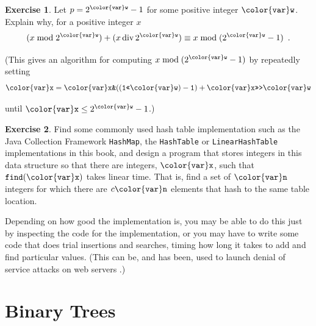 \documentclass[10pt]{book}
\newcommand{\cpponly}[1]{}\newcommand{\javaonly}[1]{#1}\newcommand{\pcodeonly}[1]{}\newcommand{\notpcode}[1]{#1}\newcommand{\lang}{Java}
\newcommand{\chaplabel}[1]{\label{chap:#1}}
\theoremstyle{plain}
\theoremstyle{definition}
\newtheorem{exc}{Exercise}[chapter]
\DeclareMathOperator{\ddiv}{div}
\begin{document}
\begin{exc}
  Let $p=2^{\ensuremath{\mathtt{{\color{var}w}}}}-1$ for some positive integer \ensuremath{\mathtt{{\color{var}w}}}.  Explain why, for a
  positive integer $x$
  \[
      (x\bmod 2^{\ensuremath{\mathtt{{\color{var}w}}}}) + (x\ddiv 2^{\ensuremath{\mathtt{{\color{var}w}}}}) \equiv x \bmod (2^{\ensuremath{\mathtt{{\color{var}w}}}}-1) \enspace .
  \]
  \javaonly{
  (This gives an algorithm for computing $x \bmod (2^{\ensuremath{\mathtt{{\color{var}w}}}}-1)$ by
  repeatedly setting
  \javaonly{\[
    \ensuremath{\mathtt{{\color{var}x} = {\color{var}x}\text{\ttfamily \&}((1\text{\ttfamily <<}{\color{var}w})-1) + {\color{var}x}\text{\ttfamily >>>}{\color{var}w}}}
  \]}
  \cpponly{\[
    \ensuremath{\mathtt{{\color{var}x} = {\color{var}x}\text{\ttfamily \&}((1\text{\ttfamily <<}{\color{var}w})-1) + {\color{var}x}\text{\ttfamily >>}{\color{var}w}}}
  \]}
  until $\ensuremath{\mathtt{{\color{var}x}}} \le 2^{\ensuremath{\mathtt{{\color{var}w}}}}-1$.)}
\end{exc}

\begin{exc}
  Find some commonly used hash table implementation such as the \javaonly{Java
  Collection Framework \texttt{HashMap},}\cpponly{C++ STL \ensuremath{\mathtt{{\color{var}unordered}\_map}},}
  the \texttt{HashTable} or \texttt{LinearHashTable} implementations in this book,
  and design a program that stores integers in this data
  structure so that there are integers, \ensuremath{\mathtt{{\color{var}x}}}, such that \ensuremath{\mathtt{find({\color{var}x})}} takes
  linear time.  That is, find a set of \ensuremath{\mathtt{{\color{var}n}}} integers for which there are
  $c\ensuremath{\mathtt{{\color{var}n}}}$ elements that hash to the same table location.

  Depending on how good the implementation is, you may be able to do this
  just by inspecting the code for the implementation, or you may have to
  write some code that does trial insertions and searches, timing how long
  it takes to add and find particular values. (This can be, and has been,
  used to launch denial of service attacks on web servers \cite{cw03}.)
\end{exc}

\clearpage

\clearpage
\chapter{Binary Trees}
\chaplabel{binarytrees}
\end{document}
